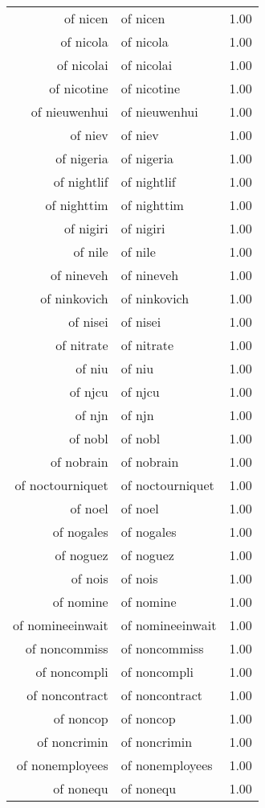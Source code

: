 \begin{table}[ht]
\begin{tabular}{rlr}
  of nicen & of nicen & 1.00 \\ 
  of nicola & of nicola & 1.00 \\ 
  of nicolai & of nicolai & 1.00 \\ 
  of nicotine & of nicotine & 1.00 \\ 
  of nieuwenhui & of nieuwenhui & 1.00 \\ 
  of niev & of niev & 1.00 \\ 
  of nigeria & of nigeria & 1.00 \\ 
  of nightlif & of nightlif & 1.00 \\ 
  of nighttim & of nighttim & 1.00 \\ 
  of nigiri & of nigiri & 1.00 \\ 
  of nile & of nile & 1.00 \\ 
  of nineveh & of nineveh & 1.00 \\ 
  of ninkovich & of ninkovich & 1.00 \\ 
  of nisei & of nisei & 1.00 \\ 
  of nitrate & of nitrate & 1.00 \\ 
  of niu & of niu & 1.00 \\ 
  of njcu & of njcu & 1.00 \\ 
  of njn & of njn & 1.00 \\ 
  of nobl & of nobl & 1.00 \\ 
  of nobrain & of nobrain & 1.00 \\ 
  of noctourniquet & of noctourniquet & 1.00 \\ 
  of noel & of noel & 1.00 \\ 
  of nogales & of nogales & 1.00 \\ 
  of noguez & of noguez & 1.00 \\ 
  of nois & of nois & 1.00 \\ 
  of nomine & of nomine & 1.00 \\ 
  of nomineeinwait & of nomineeinwait & 1.00 \\ 
  of noncommiss & of noncommiss & 1.00 \\ 
  of noncompli & of noncompli & 1.00 \\ 
  of noncontract & of noncontract & 1.00 \\ 
  of noncop & of noncop & 1.00 \\ 
  of noncrimin & of noncrimin & 1.00 \\ 
  of nonemployees & of nonemployees & 1.00 \\ 
  of nonequ & of nonequ & 1.00 \\ 

\end{tabular}
\end{table}
